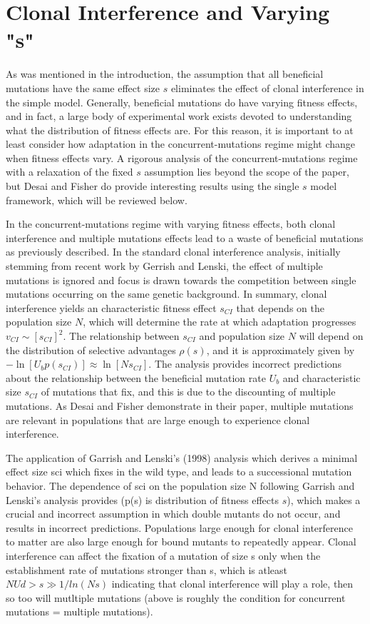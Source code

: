 \documentclass[12pt, one column]{article}
\begin{document}
\section*{Clonal Interference and Varying "s"}
As was mentioned in the introduction, the assumption that all beneficial mutations have the same effect size $s$ eliminates the effect of clonal interference in the simple model.  Generally, beneficial mutations do have varying fitness effects, and in fact, a large body of experimental work exists devoted to understanding what the distribution of fitness effects are.  For this reason, it is important to at least consider how adaptation in the concurrent-mutations regime might change when fitness effects vary.  A rigorous analysis of the concurrent-mutations regime with a relaxation of the fixed $s$ assumption lies beyond the scope of the paper, but Desai and Fisher do provide interesting results using the single $s$ model framework, which will be reviewed below.

In the concurrent-mutations regime with varying fitness effects, both clonal interference and multiple mutations effects lead to a waste of beneficial mutations as previously described.  In the standard clonal interference analysis, initially stemming from recent work by Gerrish and Lenski, the effect of multiple mutations is ignored and focus is drawn towards the competition between single mutations occurring on the same genetic background.  In summary, clonal interference yields an characteristic fitness effect $s_{CI}$ that depends on the population size $N$, which will determine the rate at which adaptation progresses $v_{CI} \sim [s_{CI}]^2$.  The relationship between $s_{CI}$ and population size $N$ will depend on the distribution of selective advantages $\rho(s)$, and it is approximately given by $-\ln[U_b p(s_{CI})] \approx \ln[N s_{CI}]$.  The analysis provides incorrect predictions about the relationship between the beneficial mutation rate $U_b$ and characteristic size $s_{CI}$ of mutations that fix, and this is due to the discounting of multiple mutations.  As Desai and Fisher demonstrate in their paper, multiple mutations are relevant in populations that are large enough to experience clonal interference.
  

The application of Garrish and Lenski's (1998) analysis which derives a minimal effect size sci which fixes in the wild type, and leads to a successional mutation behavior.
The dependence of sci on the population size N following Garrish and Lenski's analysis provides  (p(s) is distribution of fitness effects $s$), which makes a crucial and incorrect assumption in which double mutants do not occur, and results in incorrect predictions.
Populations large enough for clonal interference to matter are also large enough for bound mutants to repeatedly appear.  Clonal interference can affect the fixation of a mutation of size s only when the establishment rate of  mutations stronger than s, which is atleast $NUd>s \gg 1/ln(Ns)$ indicating that clonal interference will play a role, then so too will mutltiple mutations (above is roughly the condition for concurrent mutations = multiple mutations). 
\end{document}
